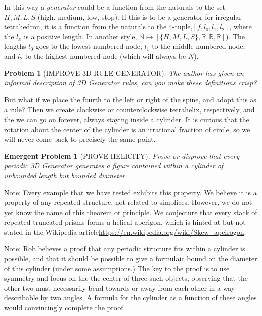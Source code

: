 \documentclass[11pt]{article}
\newtheorem{problem}{Problem}
\newtheorem{eproblem}{Emergent Problem}
\begin{document}
In this way a {\em generator} could be a function from the naturals to the set ${H,M,L,S}$ (high, medium, low, stop). If this is to be
a generator for irregular tetrahedron, it is a function from the naturals to the 4-tuple,$[f,l_0,l_1,l_2]$, where the $l_x$ is a positive length.
In another style, $\mathbb{N} \mapsto [\{H,M,L,S\},\mathbb{R},\mathbb{R},\mathbb{R}]$). The lengths $l_0$ goes to the lowest numbered node, $l_1$ to the middle-numbered node,
and $l_2$ to the highest numbered node (which will always be $N$).

\begin{problem}[IMPROVE 3D RULE GENERATOR]
  The author has given an informal description of 3D Generator rules, can you make these definitions crisp?
\end{problem}

But what if we place the fourth to the left or right of the spine, and adopt this as a rule? Then we create
clockwise or counterclockwise tetrahelix, respectively, and the we can go on forever, always staying inside a cylinder.
It is curious that the rotation about the center of the cylinder is an irrational fraction of circle, so we will
never come back to precisely the same point.

\begin{eproblem}[PROVE HELICITY]
  Prove or disprove that {\em every} periodic 3D Generator generates a figure contained within a cylinder of unbounded length but bounded diameter.
\end{eproblem}
Note: Every example that we have tested exhibits this property. We believe it is a property of any repeated structure, not related to simplices.
However, we do not yet know the name of this theorem or principle. We conjecture that every stack of repeated truncated prisms
forms a helical aperigon, which is hinted at but not stated in the Wikipedia article\url{https://en.wikipedia.org/wiki/Skew_apeirogon}.

Note: Rob believes a proof that any periodic structure fits within a cylinder is possible, and that it should be possible to give a formulaic bound
on the diameter of this cylinder (under some assumptions.) The key to the proof is to use symmetry and focus on the the center of three
such objects, observing that the other two must necessarily bend towards or away from each other in a way describable by two angles.
A formula for the cylinder as a function of these angles would convincingly complete the proof.
\end{document}
